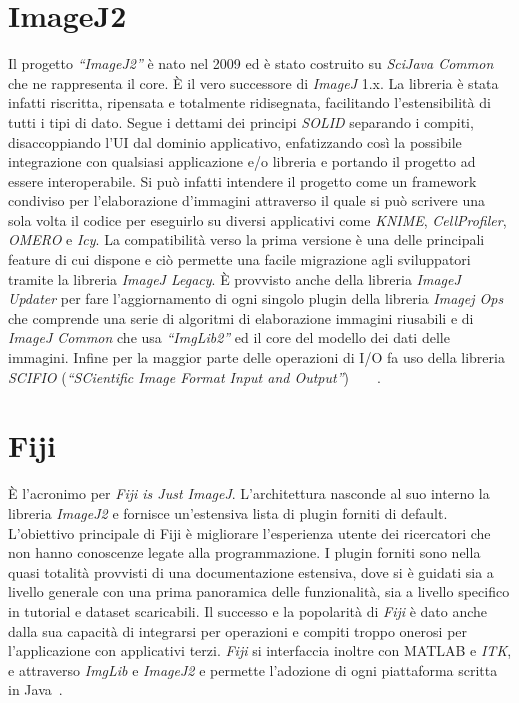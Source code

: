 \section{ImageJ2}
\noindent Il progetto \textit{``ImageJ2''} è nato nel 2009 ed è stato costruito su \textit{SciJava Common} che ne rappresenta il core. È il vero successore di \textit{ImageJ} 1.x. La libreria è stata infatti riscritta, ripensata e totalmente ridisegnata, facilitando l'estensibilità di tutti i tipi di dato. Segue i dettami dei principi \textit{SOLID} separando i compiti, disaccoppiando l'UI dal dominio applicativo, enfatizzando così la possibile integrazione con qualsiasi applicazione e/o libreria e portando il progetto ad essere interoperabile. Si può infatti intendere il progetto come un framework condiviso per l'elaborazione d'immagini attraverso il quale si può scrivere una sola volta il codice per eseguirlo su diversi applicativi come \textit{KNIME}, \textit{CellProfiler}, \textit{OMERO} e \textit{Icy}. La compatibilità verso la prima versione è una delle principali feature di cui dispone e ciò permette una facile migrazione agli sviluppatori tramite la libreria \textit{ImageJ Legacy}. È provvisto anche della libreria \textit{ImageJ Updater} per fare l'aggiornamento di ogni singolo plugin della libreria \textit{Imagej Ops} che comprende una serie di algoritmi di elaborazione immagini riusabili e di \textit{ImageJ Common} che usa \textit{``ImgLib2''} ed il core del modello dei dati delle immagini.
Infine per la maggior parte delle operazioni di I/O fa uso della libreria \textit{SCIFIO} (\textit{``SCientific Image Format Input and Output''})~\cite{https://doi.org/10.1002/mrd.22489}~\cite{Rueden2017}~\cite{Hiner2016}~\cite{10.1093/bioinformatics/bts543}.


\section{Fiji}
\noindent È l'acronimo per \textit{Fiji is Just ImageJ}. L'architettura nasconde al suo interno la libreria \textit{ImageJ2} e fornisce un'estensiva lista di plugin forniti di default.
L'obiettivo principale di Fiji è migliorare l'esperienza utente dei ricercatori che non hanno conoscenze legate alla programmazione. I plugin forniti sono nella quasi totalità provvisti di una documentazione estensiva, dove si è guidati sia a livello generale con una prima panoramica delle funzionalità, sia a livello specifico in tutorial e dataset scaricabili. Il successo e la popolarità di \textit{Fiji} è dato anche dalla sua capacità di integrarsi per operazioni e compiti troppo onerosi per l'applicazione con applicativi terzi. \textit{Fiji} si interfaccia inoltre con MATLAB e \textit{ITK}, e attraverso \textit{ImgLib} e \textit{ImageJ2} e permette l'adozione di ogni piattaforma scritta in Java~\cite{Schindelin2012}.


